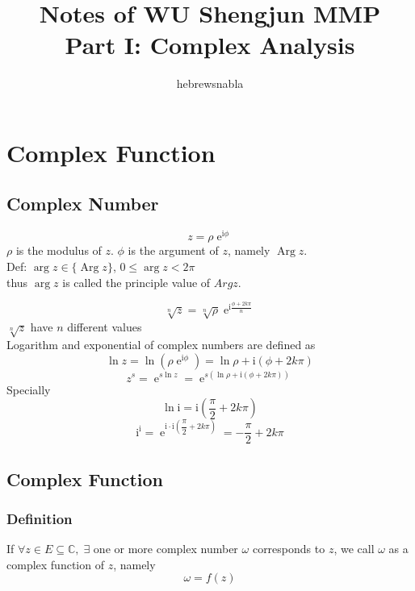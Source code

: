 \documentclass[UTF8]{ctexart} %
\title{Notes of WU Shengjun MMP\\
Part I: Complex Analysis}
\author{hebrewsnabla}
\DeclareMathOperator{\e}{\mathrm{e}}
\renewcommand{\I}{\mathrm{i}}
\DeclareMathOperator{\Arg}{\mathrm{Arg}}
\numberwithin{equation}{section}
\begin{document}
\maketitle

\section{Complex Function}
\subsection{Complex Number}
\begin{equation}\label{key}
z=\rho\e^{\I\phi}
\end{equation}
$\rho$ is the modulus of $z$. $\phi$ is the argument of $z$, namely $\Arg z$.\\
Def: $\arg z \in \{\Arg z\}$, $0 \leq \arg z < 2\pi$\\
thus $\arg z$ is called the principle value of $Arg z$.

\begin{equation}\label{key}
\sqrt[n]{z}=\sqrt[n]{\rho}\e^{\I\tfrac{\phi+2k\pi}{n}}
\end{equation}
$\sqrt[n]{z}$ have $n$ different values\\
Logarithm and exponential of complex numbers are defined as
\begin{equation}\label{key}
\ln z=\ln (\rho\e^{\I\phi})=\ln\rho+\I(\phi+2k\pi)
\end{equation}
\begin{equation}\label{key}
z^s=\e^{s\ln z}=\e^{s(\ln\rho+\I(\phi+2k\pi))}
\end{equation}
Specially
\begin{equation}\label{key}
\ln\I=\I(\dfrac{\pi}{2}+2k\pi)
\end{equation}
\begin{equation}\label{key}
\I^\I=\e^{\I\cdot\I(\dfrac{\pi}{2}+2k\pi)}=-\dfrac{\pi}{2}+2k\pi
\end{equation}

\subsection{Complex Function}
\subsubsection{Definition}
If $\forall z \in E \subseteq \mathbb{C},\; \exists$ one or more complex number $\omega$ corresponds to $z$, we call $\omega$ as a complex function of $z$, namely
\begin{equation}\label{key}
\omega = f(z)
\end{equation}
\end{document}
